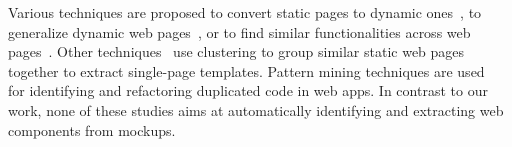 Various techniques are proposed to convert static pages to dynamic ones~\cite{Boldyreff:2002:ReverseEngineeringMaintainableWWW, Synytskyy:2003:ResolutionOfStatic}, to 
generalize dynamic web pages~\cite{Lucia:2004:ReengineeringWeb, Rajapakse:2007:Unifying},
or to find similar functionalities across web pages~\cite{DeLucia:2005:UnderstandingClonedPatterns}. Other techniques~\cite{mesbah:migrate07} use clustering to group similar static web pages together to extract single-page templates. 
Pattern mining techniques are used~\cite{Mazinanian:2014:RefactoringCSS, Davood:2016:ASE:CSSMigration, Davood:ICSE:2017:CSSDev} for identifying and refactoring duplicated \css code in web apps.
In contrast to our work, none of these studies aims at automatically identifying and extracting web components from mockups.